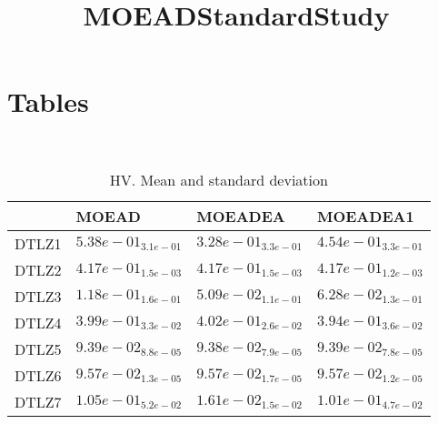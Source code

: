 \documentclass{article}
\title{MOEADStandardStudy}
\author{}
\begin{document}
\maketitle
\section{Tables}
\
\begin{table}
\caption{HV. Mean and standard deviation}
\label{table:mean.HV}
\centering
\begin{scriptsize}
\begin{tabular}{llll}
\hline & MOEAD & MOEADEA &  MOEADEA1\\
\hline
DTLZ1 & \cellcolor{gray95}$  5.38e-01_{ 3.1e-01}$ & $  3.28e-01_{ 3.3e-01}$ & $  4.54e-01_{ 3.3e-01}$ \\
DTLZ2 & \cellcolor{gray95}$  4.17e-01_{ 1.5e-03}$ & $  4.17e-01_{ 1.5e-03}$ & $  4.17e-01_{ 1.2e-03}$ \\
DTLZ3 & \cellcolor{gray95}$  1.18e-01_{ 1.6e-01}$ & $  5.09e-02_{ 1.1e-01}$ & $  6.28e-02_{ 1.3e-01}$ \\
DTLZ4 & \cellcolor{gray25}$  3.99e-01_{ 3.3e-02}$ & \cellcolor{gray95}$  4.02e-01_{ 2.6e-02}$ & $  3.94e-01_{ 3.6e-02}$ \\
DTLZ5 & \cellcolor{gray95}$  9.39e-02_{ 8.8e-05}$ & $  9.38e-02_{ 7.9e-05}$ & $  9.39e-02_{ 7.8e-05}$ \\
DTLZ6 & \cellcolor{gray95}$  9.57e-02_{ 1.3e-05}$ & $  9.57e-02_{ 1.7e-05}$ & $  9.57e-02_{ 1.2e-05}$ \\
DTLZ7 & \cellcolor{gray95}$  1.05e-01_{ 5.2e-02}$ & $  1.61e-02_{ 1.5e-02}$ & $  1.01e-01_{ 4.7e-02}$ \\
\hline
\end{tabular}
\end{scriptsize}
\end{table}
\
\end{document}
